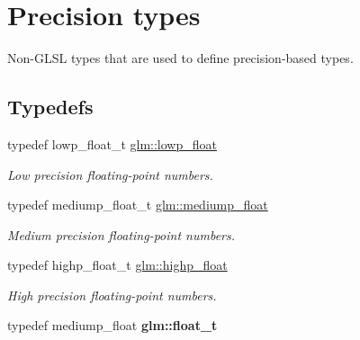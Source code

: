 \hypertarget{group__core__precision}{\section{Precision types}
\label{group__core__precision}
}


Non-\/\-G\-L\-S\-L types that are used to define precision-\/based types.  


\subsection*{Typedefs}
\begin{DoxyCompactItemize}
\item 
typedef lowp\-\_\-float\-\_\-t \hyperlink{group__core__precision_ga2887fbc729ac5c1c5caeb7cd57a7145c}{glm\-::lowp\-\_\-float}
\begin{DoxyCompactList}\small\item\em Low precision floating-\/point numbers. \end{DoxyCompactList}\item 
typedef mediump\-\_\-float\-\_\-t \hyperlink{group__core__precision_gac785826c039fe6c97c03b37c81c1a68e}{glm\-::mediump\-\_\-float}
\begin{DoxyCompactList}\small\item\em Medium precision floating-\/point numbers. \end{DoxyCompactList}\item 
typedef highp\-\_\-float\-\_\-t \hyperlink{group__core__precision_ga3d443a093adc053638ed7f81c5bfe300}{glm\-::highp\-\_\-float}
\begin{DoxyCompactList}\small\item\em High precision floating-\/point numbers. \end{DoxyCompactList}\item 
\hypertarget{group__core__precision_gae01b87f81bd15327230bf1b47c482b24}{typedef mediump\-\_\-float {\bfseries glm\-::float\-\_\-t}}\label{group__core__precision_gae01b87f81bd15327230bf1b47c482b24}


\end{DoxyCompactItemize}
